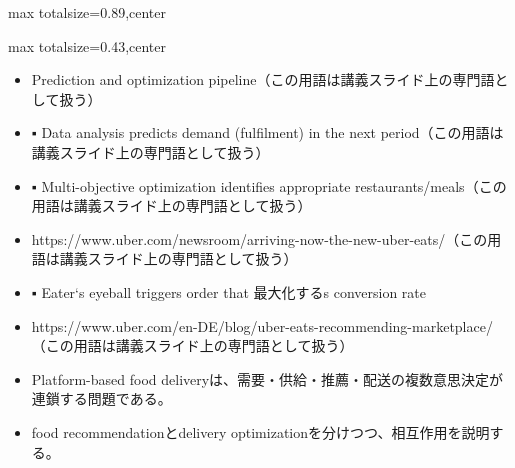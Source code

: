 \begin{minipage}[t]{0.58\textwidth}
\begin{adjustbox}{max totalsize={\textwidth}{0.89\textheight},center}
\begin{minipage}{\textwidth}
\end{minipage}
\end{adjustbox}
\end{minipage}


\clearpage
{}
\begin{minipage}[t]{0.405\textwidth}
\begin{adjustbox}{max totalsize={\textwidth}{0.43\textheight},center}
\begin{minipage}{\textwidth}\scriptsize
{}\begin{itemize}
\item Prediction and optimization pipeline（この用語は講義スライド上の専門語として扱う）
\item ▪ Data analysis predicts demand (fulfilment) in the next period（この用語は講義スライド上の専門語として扱う）
\item ▪ Multi-objective optimization identifies appropriate restaurants/meals（この用語は講義スライド上の専門語として扱う）
\item https://www.uber.com/newsroom/arriving-now-the-new-uber-eats/（この用語は講義スライド上の専門語として扱う）
\item ▪ Eater‘s eyeball triggers order that 最大化するs conversion rate
\item https://www.uber.com/en-DE/blog/uber-eats-recommending-marketplace/（この用語は講義スライド上の専門語として扱う）
\end{itemize}\begin{itemize}
\item Platform-based food deliveryは、需要・供給・推薦・配送の複数意思決定が連鎖する問題である。
\item food recommendationとdelivery optimizationを分けつつ、相互作用を説明する。
\end{itemize}
\end{minipage}
\end{adjustbox}
\end{minipage}\hfill
